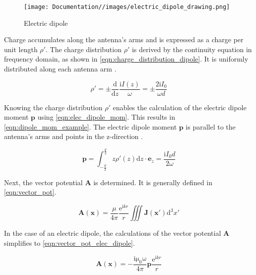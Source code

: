 
\begin{figure}[h]
    \centering
    \texttt{[image: Documentation//images/electric\_dipole\_drawing.png]}
    \caption{Electric dipole}
    \label{fig:electric_dipole}
\end{figure}

Charge accumulates along the antenna's arms and is expressed as a charge per unit length $\rho'$. The charge distribution $\rho'$ is derived by the continuity equation in frequency domain, as shown in \autoref{eqn:charge_distribution_dipole}. It is uniformly distributed along each antenna arm \cite{Griffiths_2024,Jackson}.

\begin{equation}
    \rho' = \pm\frac{\mathrm{d}}{\mathrm{d}z}\frac{\mathrm{i}I(z)}{\omega} = \pm\frac{2\mathrm{i}I_0}{\omega d}
    \label{eqn:charge_distribution_dipole}
\end{equation}

Knowing the charge distribution $\rho'$ enables the calculation of the electric dipole moment $\mathbf{p}$ using \autoref{eqn:elec_dipole_mom}. This results in \autoref{eqn:dipole_mom_example}. The electric dipole moment $\mathbf{p}$ is parallel to the antenna's arms and points in the z-direction \cite{Griffiths_2024}\cite{Jackson}. 

\begin{equation}
    \mathbf{p}=\int_{-\frac{d}{2}}^{\frac{d}{2}}z\rho'(z)\mathrm{d}z\cdot\mathbf{e}_z = \frac{\mathrm{i}I_0d}{2\omega}
    \label{eqn:dipole_mom_example}
\end{equation}

Next, the vector potential $\mathbf{A}$ is determined. It is generally defined in \autoref{eqn:vector_pot}\cite{Balanis_1997}\cite{Jackson}. %

\begin{equation}
    \mathbf{A}(\mathbf{x})=\frac{\mu}{4\pi}\frac{\mathrm{e}^{\mathrm{i}kr}}{r}\iiint \mathbf{J}(\mathbf{x'})\mathrm{d}^3x'
    \label{eqn:vector_pot}
\end{equation}

In the case of an electric dipole, the calculations of the vector potential $\mathbf{A}$ simplifies to \autoref{eqn:vector_pot_elec_dipole}\cite{Jackson}.

\begin{equation}
    \mathbf{A} (\mathbf{x})=-\frac{\mathrm{i\mu_0\omega}}{4\pi}\mathbf{p}\frac{\mathrm{e}^{\mathrm{i}kr}}{r}
    \label{eqn:vector_pot_elec_dipole}
\end{equation}

